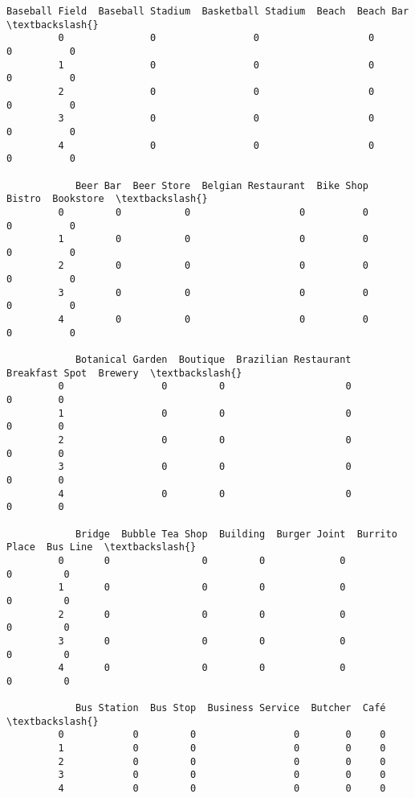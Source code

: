 \documentclass[11pt]{article}
\begin{document}
\begin{Verbatim}[commandchars=\\\{\}]
            Baseball Field  Baseball Stadium  Basketball Stadium  Beach  Beach Bar  \textbackslash{}
         0               0                 0                   0      0          0   
         1               0                 0                   0      0          0   
         2               0                 0                   0      0          0   
         3               0                 0                   0      0          0   
         4               0                 0                   0      0          0   
         
            Beer Bar  Beer Store  Belgian Restaurant  Bike Shop  Bistro  Bookstore  \textbackslash{}
         0         0           0                   0          0       0          0   
         1         0           0                   0          0       0          0   
         2         0           0                   0          0       0          0   
         3         0           0                   0          0       0          0   
         4         0           0                   0          0       0          0   
         
            Botanical Garden  Boutique  Brazilian Restaurant  Breakfast Spot  Brewery  \textbackslash{}
         0                 0         0                     0               0        0   
         1                 0         0                     0               0        0   
         2                 0         0                     0               0        0   
         3                 0         0                     0               0        0   
         4                 0         0                     0               0        0   
         
            Bridge  Bubble Tea Shop  Building  Burger Joint  Burrito Place  Bus Line  \textbackslash{}
         0       0                0         0             0              0         0   
         1       0                0         0             0              0         0   
         2       0                0         0             0              0         0   
         3       0                0         0             0              0         0   
         4       0                0         0             0              0         0   
         
            Bus Station  Bus Stop  Business Service  Butcher  Café  \textbackslash{}
         0            0         0                 0        0     0   
         1            0         0                 0        0     0   
         2            0         0                 0        0     0   
         3            0         0                 0        0     0   
         4            0         0                 0        0     0   
         

\end{Verbatim}
\end{document}
